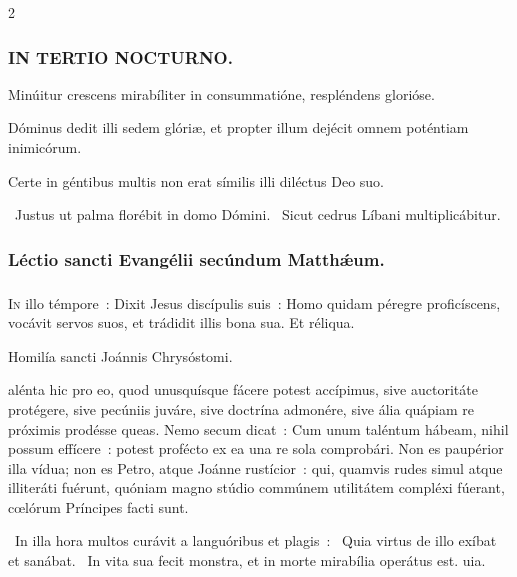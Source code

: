 \documentclass[9pt,twoside]{extarticle}
\begin{document}
\begin{multicols}{2}
{\subsubsection*{\center \textsc{IN TERTIO NOCTURNO.}}
\begin{tightlist}{}
\item {} Minúitur crescens mirabíliter in consummatióne, respléndens glorióse.
\item {} Dóminus dedit illi sedem glóriæ, et propter illum dejécit omnem poténtiam inimicórum.
\item {} Certe in géntibus multis non erat símilis illi diléctus Deo suo.
\item {}~Justus ut palma florébit in domo Dómini. ~Sicut cedrus Líbani multiplicábitur.
\end{tightlist}

\subsubsection*{\center Léctio sancti Evangélii secúndum Matthǽum.}
\subsubsection*{\center {} \hfill {}}
\lettrine{I}n illo témpore~: Dixit Jesus discípulis suis~: Homo quidam péregre proficíscens, vocávit servos suos, et trádidit illis bona sua. Et réliqua.

\begin{center}Homilía sancti Joánnis Chrysóstomi.\\
\end{center}
alénta hic pro eo, quod unusquísque fácere potest accípimus, sive auctoritáte protégere, sive pecúniis juváre, sive doctrína admonére, sive ália quápiam re próximis prodésse queas. Nemo secum dicat~: Cum unum taléntum hábeam, nihil possum effícere~: potest profécto ex ea una re sola comprobári. Non es paupérior illa vídua; non es Petro, atque Joánne rustícior~: qui, quamvis rudes simul atque illiteráti fuérunt, quóniam magno stúdio commúnem utilitátem compléxi fúerant, cœlórum Príncipes facti sunt.

\begin{tightlist}{}
\item {}~In illa hora multos curávit a languóribus et plagis~: \textred{*}~Quia virtus de illo exíbat et sanábat. ~In vita sua fecit monstra, et in morte mirabília operátus est. uia.
\end{tightlist}

}
\end{multicols}
\end{document}
